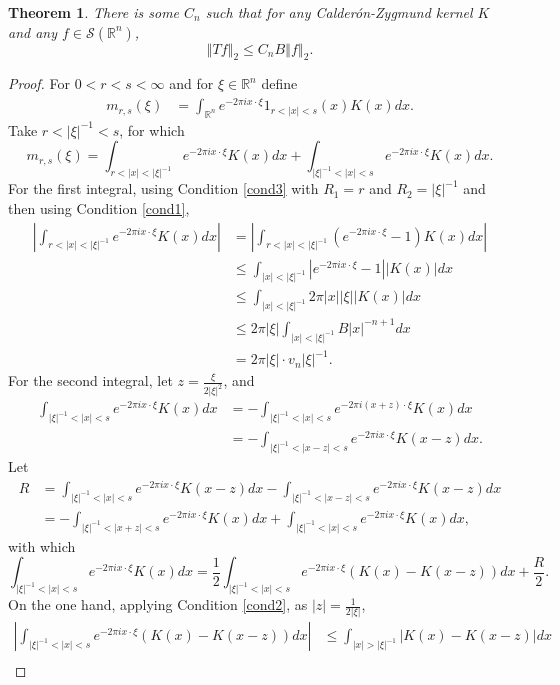 \documentclass{article}
\newcommand{\norm}[1]{\left\Vert #1 \right\Vert}
\newtheorem{theorem}{Theorem}
\theoremstyle{definition}
\begin{document}
\begin{theorem}
There is some $C_n$ such that for any Calder\'on-Zygmund kernel $K$
and any $f \in \mathscr{S}(\mathbb{R}^n)$,
\[
\norm{Tf}_2 \leq C_n B\norm{f}_2.
\]
\end{theorem}
\begin{proof}
For $0<r<s<\infty$  and
for $\xi \in \mathbb{R}^n$ define
\begin{align*}
m_{r,s}(\xi) &= \int_{\mathbb{R}^n} e^{-2\pi ix\cdot \xi}  1_{r<|x|<s}(x)  K(x) dx.
\end{align*}
Take $r<|\xi|^{-1}<s$, for which
\[
m_{r,s}(\xi) = \int_{r<|x|<|\xi|^{-1}} e^{-2\pi ix\cdot \xi} K(x) dx 
+ \int_{|\xi|^{-1}<|x|<s} e^{-2\pi ix\cdot \xi} K(x) dx.
\]
For the first integral, using Condition \ref{cond3} with $R_1=r$ and $R_2=|\xi|^{-1}$ and then using Condition \ref{cond1},
\begin{align*}
\left|\int_{r<|x|<|\xi|^{-1}} e^{-2\pi ix\cdot \xi} K(x) dx\right| &
= \left|\int_{r<|x|<|\xi|^{-1}} (e^{-2\pi ix\cdot \xi}-1) K(x) dx\right|\\
&\leq \int_{|x|<|\xi|^{-1}} |e^{-2\pi ix\cdot \xi}-1| |K(x)| dx\\
&\leq  \int_{|x|<|\xi|^{-1}} 2\pi |x| |\xi| |K(x)| dx\\
&\leq 2\pi |\xi| \int_{|x|<|\xi|^{-1}} B |x|^{-n+1} dx\\
&=2\pi |\xi| \cdot v_n |\xi|^{-1}.
\end{align*}
For the second integral, let $z=\frac{\xi}{2|\xi|^2}$, and 
\begin{align*}
\int_{|\xi|^{-1} < |x|<s} e^{-2\pi ix\cdot \xi} K(x) dx&= -\int_{|\xi|^{-1}<|x|<s}e^{-2\pi i(x+z) \cdot \xi} K(x) dx\\
&=-\int_{|\xi|^{-1}<|x-z|<s} e^{-2\pi ix\cdot \xi} K(x-z) dx.
\end{align*}
Let
\begin{align*}
R &= \int_{|\xi|^{-1}<|x|<s} e^{-2\pi ix\cdot \xi}K(x-z) dx - \int_{|\xi|^{-1}<|x-z|<s} e^{-2\pi ix\cdot \xi} K(x-z) dx\\
&=-\int_{|\xi|^{-1}<|x+z|<s} e^{-2\pi ix\cdot \xi} K(x) dx + \int_{|\xi|^{-1}<|x|<s} e^{-2\pi ix\cdot \xi} K(x) dx,
\end{align*}
with which
\[
\int_{|\xi|^{-1} < |x|<s} e^{-2\pi ix\cdot \xi} K(x) dx = \frac{1}{2} \int_{|\xi|^{-1}<|x|<s} e^{-2\pi ix\cdot \xi} (K(x)-K(x-z)) dx
+\frac{R}{2}.
\]
On the one hand, applying Condition \ref{cond2}, as $|z| = \frac{1}{2|\xi|}$,
\begin{align*}
\left| \int_{|\xi|^{-1}<|x|<s} e^{-2\pi ix\cdot \xi} (K(x)-K(x-z)) dx \right|&\leq \int_{|x|>|\xi|^{-1}} |K(x)-K(x-z)| dx\\

\end{align*}
\end{proof}
\end{document}
